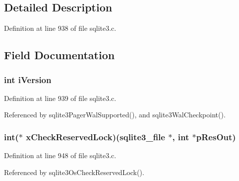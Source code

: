 \subsection{Detailed Description}


Definition at line 938 of file sqlite3.\+c.



\subsection{Field Documentation}
\hypertarget{structsqlite3__io__methods_a1138620d71393e6105389670719d9685}{}
\subsubsection[{i\+Version}]{\setlength{\rightskip}{0pt plus 5cm}int i\+Version}\label{structsqlite3__io__methods_a1138620d71393e6105389670719d9685}


Definition at line 939 of file sqlite3.\+c.



Referenced by sqlite3\+Pager\+Wal\+Supported(), and sqlite3\+Wal\+Checkpoint().

\hypertarget{structsqlite3__io__methods_a5eb19302e4f81de062ae2f589d3c5955}{}
\subsubsection[{x\+Check\+Reserved\+Lock}]{\setlength{\rightskip}{0pt plus 5cm}int($\ast$ x\+Check\+Reserved\+Lock)({\bf sqlite3\+\_\+file} $\ast$, int $\ast$p\+Res\+Out)}\label{structsqlite3__io__methods_a5eb19302e4f81de062ae2f589d3c5955}


Definition at line 948 of file sqlite3.\+c.



Referenced by sqlite3\+Os\+Check\+Reserved\+Lock().

\hypertarget{structsqlite3__io__methods_a38f9e3ecb6bc5ed12f45fca5d85344c8}{}
